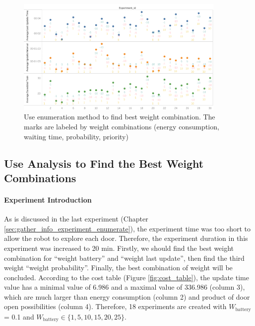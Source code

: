 \begin{figure}[htbp]
 \centering
 \includegraphics[width = 0.9\textwidth]{content/images/ch5/gather_info_enumerate.png}
 \caption{Use enumeration method to find best weight combination. The marks are labeled by weight combinations (energy consumption, waiting time, probability, priority)}
 \label{fig:gather_info_experiment_enumerate}
\end{figure}


\subsection{Use Analysis to Find the Best Weight Combinations}

\paragraph{Experiment Introduction} 
As is discussed in the last experiment (Chapter \ref{sec:gather_info_experiment_enumerate}), the experiment time was too short to allow the robot to explore each door. Therefore, the experiment duration in this experiment was increased to 20 min.
Firstly, we should find the best weight combination for ``weight battery'' and ``weight last update'', then find the third weight ``weight probability''. Finally, the best combination of weight will be concluded.
 According to the cost table (Figure \ref{fig:cost_table}), the update time value has a minimal value of 6.986 and a maximal value of 336.986 (column 3), which are much larger than energy consumption (column 2) and product of door open possibilities (column 4).
 Therefore, 18 experiments are created with $W_{\mbox{battery}}$
 = 0.1 and $W_{\mbox{battery}} \in \{1,5,10,15,20,25 \}$.

